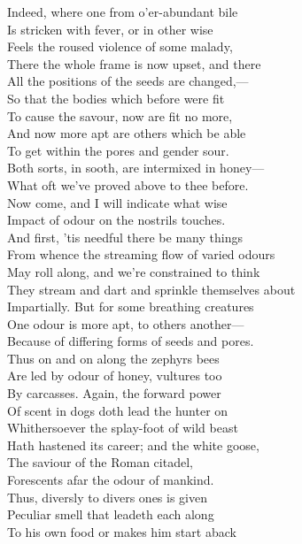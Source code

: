 Indeed, where one from o'er-abundant bile\\
Is stricken with fever, or in other wise\\
Feels the roused violence of some malady,\\
There the whole frame is now upset, and there\\
All the positions of the seeds are changed,—\\
So that the bodies which before were fit\\
To cause the savour, now are fit no more,\\
And now more apt are others which be able\\
To get within the pores and gender sour.\\
Both sorts, in sooth, are intermixed in honey—\\
What oft we've proved above to thee before.\\
Now come, and I will indicate what wise\\
Impact of odour on the nostrils touches.\\
And first, 'tis needful there be many things\\
From whence the streaming flow of varied odours\\
May roll along, and we're constrained to think\\
They stream and dart and sprinkle themselves about\\
Impartially. But for some breathing creatures\\
One odour is more apt, to others another—\\
Because of differing forms of seeds and pores.\\
Thus on and on along the zephyrs bees\\
Are led by odour of honey, vultures too\\
By carcasses. Again, the forward power\\
Of scent in dogs doth lead the hunter on\\
Whithersoever the splay-foot of wild beast\\
Hath hastened its career; and the white goose,\\
The saviour of the Roman citadel,\\
Forescents afar the odour of mankind.\\
Thus, diversly to divers ones is given\\
Peculiar smell that leadeth each along\\
To his own food or makes him start aback\\
